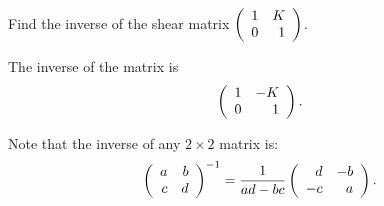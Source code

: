 \documentclass{ximera}
\begin{document}
\begin{exercise} \label{c7.8.4}
Find the inverse of the shear matrix $\left(\begin{array}{rr} 1 & K\\ 0 &1\end{array}\right)$.

\begin{solution}

\ans The inverse of the matrix is
\[
\left(\begin{array}{rr} 1 & -K\\ 0 &1\end{array}\right).
\]

\soln Note that the inverse of any $2 \times 2$ matrix is:
\[ \left(\begin{array}{rr} a & b\\ c &d\end{array}\right)^{-1} = \frac{1}{ad - bc}\left(\begin{array}{rr} d & -b\\ -c &a\end{array}\right). \]


\end{solution}
\end{exercise}
\end{document}
